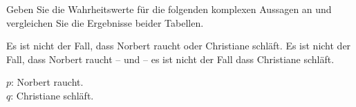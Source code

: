 \begin{frame}

Geben Sie die Wahrheitswerte für die folgenden komplexen Aussagen an und vergleichen Sie die Ergebnisse beider Tabellen.

\ea\label{ex:Equi5} Es ist nicht der Fall, dass Norbert raucht oder Christiane schläft.
\ex\label{ex:Equi6} Es ist nicht der Fall, dass Norbert raucht -- und -- es ist nicht der Fall dass Christiane schläft.
\z 	

\pause

{\small 
	$p$: Norbert raucht.\\
	$q$: Christiane schläft.
}

\pause 

\begin{minipage}{0.48\textwidth}
	\centering
	
\end{minipage}
\pause
\begin{minipage}{0.48\textwidth}
	\centering
	
	
\end{minipage}

\end{frame}


